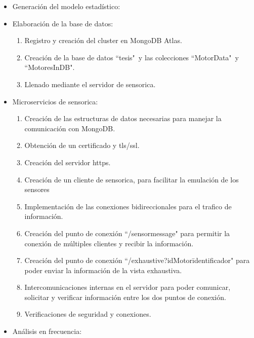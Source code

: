 \begin{itemize}
    \item Generación del modelo estadístico:

    \item Elaboración de la base de datos:
        \begin{enumerate}
            \item Registro y creación del cluster en MongoDB Atlas.
            \item Creación de la base de datos ``tesis"\  y las colecciones
                ``MotorData"\  y ``MotoresInDB".
            \item Llenado mediante el servidor de sensorica.
        \end{enumerate}

    \item Microservicios de sensorica:
        \begin{enumerate}
            \item Creación de las estructuras de datos necesarias para manejar
                la comunicación con MongoDB.
            \item Obtención de un certificado y tls/ssl.
            \item Creación del servidor https.
            \item Creación de un cliente de sensorica, para facilitar la emulación
                de los sensores
            \item Implementación de las conexiones bidireccionales para el trafico
                de información.
            \item Creación del punto de conexión ``/sensormessage" para permitir
                la conexión de múltiples clientes y recibir la información.
            \item Creación del punto de conexión ``/exhaustive?idMotor\=identificador"
                para poder enviar la información de la vista exhaustiva.
            \item Intercomunicaciones internas en el servidor para poder comunicar,
                solicitar y verificar información entre los dos puntos de conexión.
            \item Verificaciones de seguridad y conexiones.
        \end{enumerate}

    \item Análisis en frecuencia:


\end{itemize}
